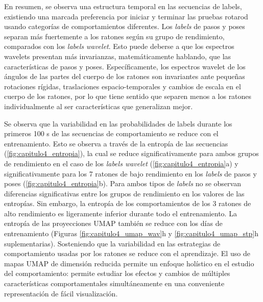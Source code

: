En resumen, se observa una estructura temporal en las secuencias de labels, existiendo una marcada preferencia por iniciar y terminar las pruebas rotarod usando categorías de comportamientos diferentes. Los \textit{labels} de pasos y poses separan más fuertemente a los ratones según su grupo de rendimiento, comparados con los \textit{labels} \textit{wavelet}. Esto puede deberse a que los espectros wavelets presentan más invarianzas, matemáticamente hablando, que las características de pasos y poses. Específicamente, los espectros wavelet de los ángulos de las partes del cuerpo de los ratones son invariantes ante pequeñas rotaciones rígidas, traslaciones espacio-temporales y cambios de escala en el cuerpo de los ratones, por lo que tiene sentido que separen menos a los ratones individualmente al ser características que generalizan mejor.

Se observa que la variabilidad en las probabilidades de labels durante los primeros 100 s de las secuencias de comportamiento se reduce con el entrenamiento. Esto se observa a través de la entropía de las secuencias (\autoref{fig:capitulo4_entropia}), la cual se reduce significativamente para ambos grupos de rendimiento en el caso de los \textit{labels wavelet} (\autoref{fig:capitulo4_entropia}a) y significativamente para los 7 ratones de bajo rendimiento en los \textit{labels} de pasos y poses (\autoref{fig:capitulo4_entropia}b). Para ambos tipos de \textit{labels} no se observan diferencias significativas entre los grupos de rendimiento en los valores de las entropías. Sin embargo, la entropía de los comportamientos de los 3 ratones de alto rendimiento es ligeramente inferior durante todo el entrenamiento. La entropía de las proyecciones UMAP también se reduce con los días de entrenamiento (Figuras \ref{fig:capitulo4_umap_wav}h y \ref{fig:capitulo4_umap_stp}h suplementarias). Sosteniendo que la variabilidad en las estrategias de comportamiento usadas por los ratones se reduce con el aprendizaje. El uso de mapas UMAP de dimensión reducida permite un enfoque holístico en el estudio del comportamiento: permite estudiar los efectos y cambios de múltiples características comportamentales simultáneamente en una conveniente representación de fácil visualización.

